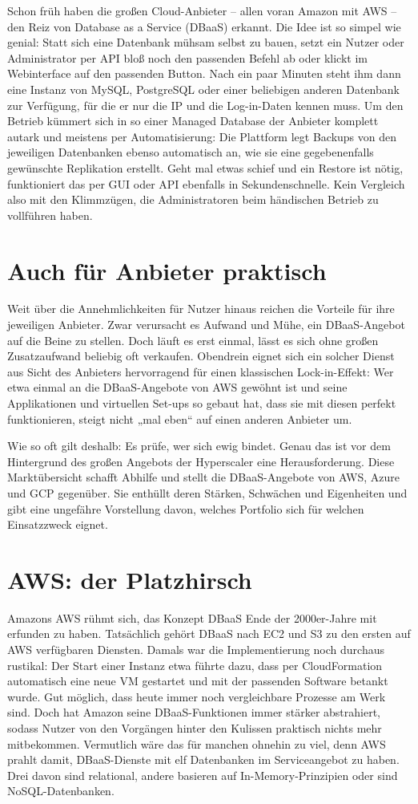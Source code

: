 Schon früh haben die großen Cloud-Anbieter – allen voran Amazon mit AWS – den Reiz von Database as a Service (DBaaS) erkannt. Die Idee ist so simpel wie genial: Statt sich eine Datenbank mühsam selbst zu bauen, setzt ein Nutzer oder Administrator per API bloß noch den passenden Befehl ab oder klickt im Webinterface auf den passenden Button. Nach ein paar Minuten steht ihm dann eine Instanz von MySQL, PostgreSQL oder einer beliebigen anderen Datenbank zur Verfügung, für die er nur die IP und die Log-in-Daten kennen muss. Um den Betrieb kümmert sich in so einer Managed Database der Anbieter komplett autark und meistens per Automatisierung: Die Plattform legt Backups von den jeweiligen Datenbanken ebenso automatisch an, wie sie eine gegebenenfalls gewünschte Replikation erstellt. Geht mal etwas schief und ein Restore ist nötig, funktioniert das per GUI oder API ebenfalls in Sekundenschnelle. Kein Vergleich also mit den Klimmzügen, die Administratoren beim händischen Betrieb zu vollführen haben.

\section{Auch für Anbieter praktisch}
Weit über die Annehmlichkeiten für Nutzer hinaus reichen die Vorteile für ihre jeweiligen Anbieter. Zwar verursacht es Aufwand und Mühe, ein DBaaS-Angebot auf die Beine zu stellen. Doch läuft es erst einmal, lässt es sich ohne großen Zusatzaufwand beliebig oft verkaufen. Obendrein eignet sich ein solcher Dienst aus Sicht des Anbieters hervorragend für einen klassischen Lock-in-Effekt: Wer etwa einmal an die DBaaS-Angebote von AWS gewöhnt ist und seine Applikationen und virtuellen Set-ups so gebaut hat, dass sie mit diesen perfekt funktionieren, steigt nicht „mal eben“ auf einen anderen Anbieter um.

Wie so oft gilt deshalb: Es prüfe, wer sich ewig bindet. Genau das ist vor dem Hintergrund des großen Angebots der Hyperscaler eine Herausforderung. Diese Marktübersicht schafft Abhilfe und stellt die DBaaS-Angebote von AWS, Azure und GCP gegenüber. Sie enthüllt deren Stärken, Schwächen und Eigenheiten und gibt eine ungefähre Vorstellung davon, welches Portfolio sich für welchen Einsatzzweck eignet.

\section{AWS: der Platzhirsch}
Amazons AWS rühmt sich, das Konzept DBaaS Ende der 2000er-Jahre mit erfunden zu haben. Tatsächlich gehört DBaaS nach EC2 und S3 zu den ersten auf AWS verfügbaren Diensten. Damals war die Implementierung noch durchaus rustikal: Der Start einer Instanz etwa führte dazu, dass per CloudFormation automatisch eine neue VM gestartet und mit der passenden Software betankt wurde. Gut möglich, dass heute immer noch vergleichbare Prozesse am Werk sind. Doch hat Amazon seine DBaaS-Funktionen immer stärker abstrahiert, sodass Nutzer von den Vorgängen hinter den Kulissen praktisch nichts mehr mitbekommen. Vermutlich wäre das für manchen ohnehin zu viel, denn AWS prahlt damit, DBaaS-Dienste mit elf Datenbanken im Serviceangebot zu haben. Drei davon sind relational, andere basieren auf In-Memory-Prinzipien oder sind NoSQL-Datenbanken.

